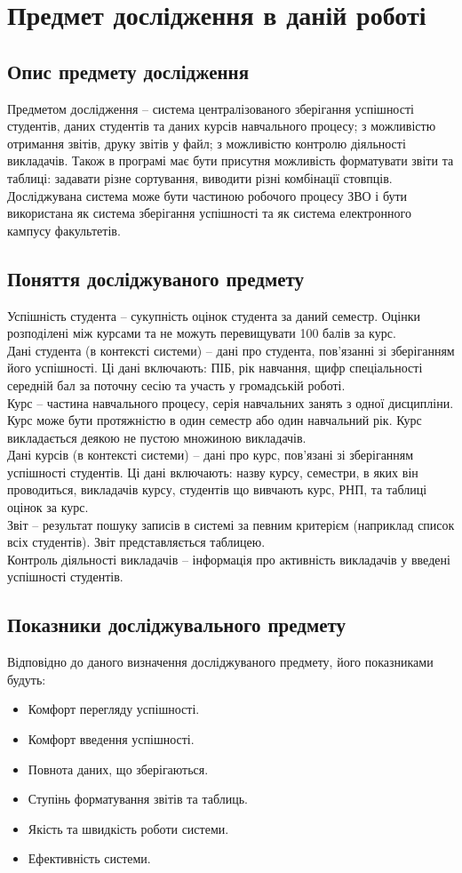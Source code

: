 \documentclass[14pt,a4paper,oneside]{extbook}
\begin{document}
\chapter{Предмет дослідження в даній роботі}
\section{Опис предмету дослідження}
	Предметом дослідження – система централізованого зберігання успішності студентів, даних студентів та даних курсів навчального процесу; з можливістю отримання звітів, друку звітів у файл; з можливістю контролю діяльності викладачів. Також в програмі має бути присутня можливість форматувати звіти та таблиці: задавати різне сортування, виводити різні комбінації стовпців.\\
	Досліджувана система може бути частиною робочого процесу ЗВО і бути використана як система зберігання успішності та як система електронного кампусу факультетів.\\
\section{Поняття досліджуваного предмету}
	Успішність студента – сукупність оцінок студента за даний семестр. Оцінки розподілені між курсами та не можуть перевищувати 100 балів за курс.\\
	Дані студента (в контексті системи) – дані про студента, пов’язанні зі зберіганням його успішності. Ці дані включають: ПІБ, рік навчання, щифр спеціальності середній бал за поточну сесію та участь у громадській роботі.\\
	Курс – частина навчального процесу, серія навчальних занять з одної дисципліни. Курс може бути протяжністю в один семестр або один навчальний рік. Курс викладається деякою не пустою множиною викладачів. \\
	Дані курсів (в контексті системи) – дані про курс, пов’язані зі зберіганням успішності студентів. Ці дані включають: назву курсу, семестри, в яких він проводиться, викладачів курсу, студентів що вивчають курс, РНП, та таблиці оцінок за курс.\\
	Звіт – результат пошуку записів в системі за певним критерієм (наприклад список всіх студентів). Звіт представляється таблицею.\\
	Контроль діяльності викладачів – інформація про активність викладачів у введені успішності студентів.\\
\section{Показники досліджувального предмету}
	Відповідно до даного визначення досліджуваного предмету, його показниками будуть:
	\begin{itemize}
		\item Комфорт перегляду успішності.
		\item Комфорт введення успішності.
		\item Повнота даних, що зберігаються.
		\item Ступінь форматування звітів та таблиць.
		\item Якість та швидкість роботи системи.
		\item Ефективність системи.
	\end{itemize}
\end{document}
